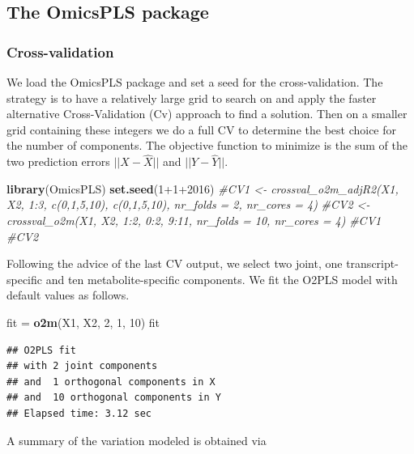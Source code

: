 \documentclass[]{article}
\newenvironment{Shaded}{\begin{snugshade}}{\end{snugshade}}
\newcommand{\KeywordTok}[1]{\textcolor[rgb]{0.13,0.29,0.53}{\textbf{{#1}}}}
\newcommand{\DecValTok}[1]{\textcolor[rgb]{0.00,0.00,0.81}{{#1}}}
\newcommand{\StringTok}[1]{\textcolor[rgb]{0.31,0.60,0.02}{{#1}}}
\newcommand{\CommentTok}[1]{\textcolor[rgb]{0.56,0.35,0.01}{\textit{{#1}}}}
\newcommand{\NormalTok}[1]{{#1}}
\begin{document}
\subsection{The OmicsPLS package}\label{the-omicspls-package}

\subsubsection{Cross-validation}\label{cross-validation-1}

We load the OmicsPLS package and set a seed for the cross-validation.
The strategy is to have a relatively large grid to search on and apply
the faster alternative Cross-Validation (Cv) approach to find a
solution. Then on a smaller grid containing these integers we do a full
CV to determine the best choice for the number of components. The
objective function to minimize is the sum of the two prediction errors
\(||X-\hat{X}||\) and \(||Y-\hat{Y}||\).

\begin{Shaded}
\begin{Highlighting}[]
\KeywordTok{library}\NormalTok{(OmicsPLS)}
\KeywordTok{set.seed}\NormalTok{(}\DecValTok{1+1+2016}\NormalTok{)}
\CommentTok{#CV1 <- crossval_o2m_adjR2(X1, X2, 1:3, c(0,1,5,10), c(0,1,5,10), nr_folds = 2, nr_cores = 4)}
\CommentTok{#CV2 <- crossval_o2m(X1, X2, 1:2, 0:2, 9:11, nr_folds = 10, nr_cores = 4)}
\CommentTok{#CV1}
\CommentTok{#CV2}
\end{Highlighting}
\end{Shaded}

Following the advice of the last CV output, we select two joint, one
transcript-specific and ten metabolite-specific components. We fit the
O2PLS model with default values as follows.

\begin{Shaded}
\begin{Highlighting}[]
\NormalTok{fit =}\StringTok{ }\KeywordTok{o2m}\NormalTok{(X1, X2, }\DecValTok{2}\NormalTok{, }\DecValTok{1}\NormalTok{, }\DecValTok{10}\NormalTok{)}
\NormalTok{fit}
\end{Highlighting}
\end{Shaded}

\begin{verbatim}
## O2PLS fit 
## with 2 joint components  
## and  1 orthogonal components in X 
## and  10 orthogonal components in Y 
## Elapsed time: 3.12 sec
\end{verbatim}

A summary of the variation modeled is obtained via
\end{document}

